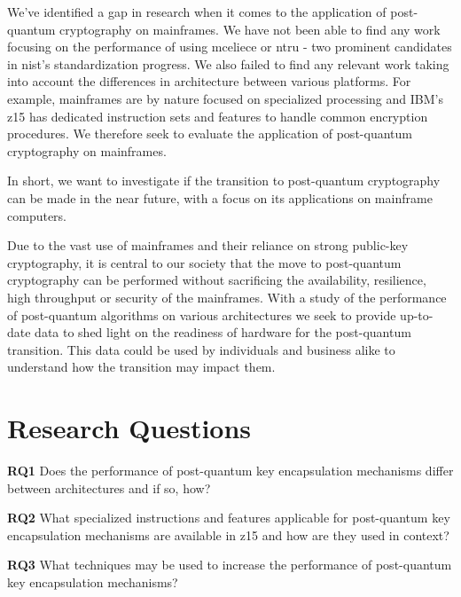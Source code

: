 We've identified a gap in research when it comes to the application of post-quantum cryptography on mainframes. We have not been able to find any work focusing on the performance of using \gls{mceliece} or \gls{ntru} - two prominent candidates in \gls{nist}'s standardization progress. We also failed to find any relevant work taking into account the differences in architecture between various platforms. For example, mainframes are by nature focused on specialized processing and IBM's z15 has dedicated instruction sets and features to handle common encryption procedures\cite{ibm2020:quantum-computer}. We therefore seek to evaluate the application of post-quantum cryptography on mainframes.

In short, we want to investigate if the transition to post-quantum cryptography can be made in the near future, with a focus on its applications on mainframe computers.

Due to the vast use of mainframes and their reliance on strong public-key cryptography, it is central to our society that the move to post-quantum cryptography can be performed without sacrificing the availability, resilience, high throughput or security of the mainframes. With a study of the performance of post-quantum algorithms on various architectures we seek to provide up-to-date data to shed light on the readiness of hardware for the post-quantum transition. This data could be used by individuals and business alike to understand how the transition may impact them.


\section{Research Questions}
\label{section:introduction:research-questions}

\noindent\textbf{RQ1} Does the performance of \gls{post-quantum} key encapsulation mechanisms differ between architectures and if so, how?\label{rq1}\hfill\par
\noindent\textbf{RQ2} What specialized instructions and features applicable for \gls{post-quantum} key encapsulation mechanisms are available in \gls{z15} and how are they used in context?\label{rq2}\hfill\par
\noindent\textbf{RQ3} What techniques may be used to increase the performance of \gls{post-quantum} key encapsulation mechanisms?\label{rq3}\hfill\par

